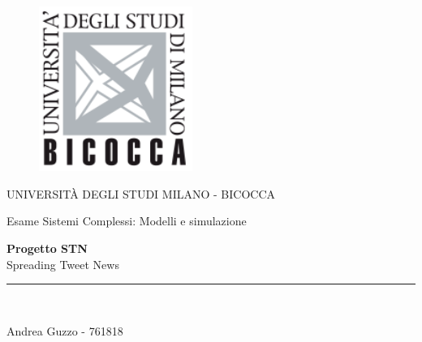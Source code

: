 \documentclass[11pt, english]{article}
\begin{document}
\begin{titlepage}

\begin{center}
\vspace*{-1in}
\begin{figure}[htb]
\begin{center}
\includegraphics[width=5cm]{Resources/BicoccaLogo.png}
\end{center}
\end{figure}
UNIVERSITÀ DEGLI STUDI MILANO - BICOCCA \\
\vspace*{0.4in}
\begin{large}
Esame Sistemi Complessi: Modelli e simulazione\\
\end{large}
\vspace*{0.2in}
\begin{Large}
\textbf{Progetto STN} \\
\vspace*{0.15in}
Spreading Tweet News \\
\end{Large}
\vspace*{0.3in}

\vspace*{0.3in}
\rule{80mm}{0.1mm}\\
\vspace*{0.1in}
\begin{large}
Andrea Guzzo - 761818
\end{large}
\end{center}
\end{titlepage}

\newcommand{\CC}{C\nolinebreak\hspace{-.05em}\raisebox{.4ex}{\tiny\bf +}\nolinebreak\hspace{-.10em}\raisebox{.4ex}{\tiny\bf +}}
\def\CC{{C\nolinebreak[4]\hspace{-.05em}\raisebox{.4ex}{\tiny\bf ++}}}
\end{document}
